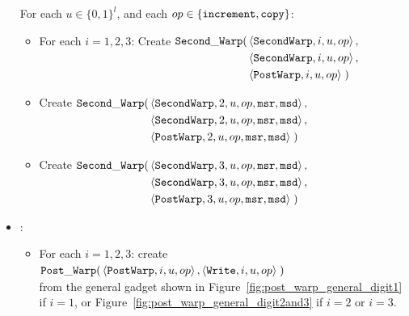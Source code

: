 \begin{itemize}
        For each $u \in \{0, 1\}^l$, and each $op \in \{ {\tt increment, copy } \}$:
        \begin{itemize}
        \item For each $i = 1, 2, 3$: Create
        $\begin{aligned}[t]
            \secondwarp(& \left\langle {\tt SecondWarp}, i, u, \inc \right\rangle,   \\ %
                        & \left\langle {\tt SecondWarp}, i, u, \inc \right\rangle,   \\ %
                        & \left\langle {\tt PostWarp},   i, u, \inc \right\rangle \;)   %
        \end{aligned}$

        \vspace{0.5cm}

        \item Create
        $\begin{aligned}[t]
            \secondwarp(& \left\langle {\tt SecondWarp}, 2, u, \inc, {\tt msr}, {\tt msd} \right\rangle, \\ %
                        & \left\langle {\tt SecondWarp}, 2, u, \inc, {\tt msr}, {\tt msd} \right\rangle, \\ %
                        & \left\langle {\tt PostWarp},   2, u, \inc, {\tt msr}, {\tt msd} \right\rangle \;) %
        \end{aligned}$
        \vspace{0.5cm}

        \item Create
        $\begin{aligned}[t]
            \secondwarp(& \left\langle {\tt SecondWarp}, 3, u, \inc, {\tt msr}, {\tt msd} \right\rangle, \\ %
                        & \left\langle {\tt SecondWarp}, 3, u, \inc, {\tt msr}, {\tt msd} \right\rangle, \\ %
                        & \left\langle {\tt PostWarp},   3, u, \inc, {\tt msr}, {\tt msd} \right\rangle \;) %
        \end{aligned}$
        \end{itemize}

        \item {\postwarp}:
        \begin{itemize}
           \item For each $i = 1,2,3$: create\\
            $\begin{aligned}[t]
                \postwarp(& \left \langle {\tt PostWarp}, i, u, \inc \right\rangle,    %
                            \left \langle {\tt Write},    i, u, \inc \right\rangle \;) %
            \end{aligned}$ \\
            from the general gadget shown in Figure~\ref{fig:post_warp_general_digit1} if $i = 1$,
            or Figure~\ref{fig:post_warp_general_digit2and3} if $ i = 2$ or $i = 3$.
            \vspace{.5cm}



\end{itemize}
\end{itemize}
